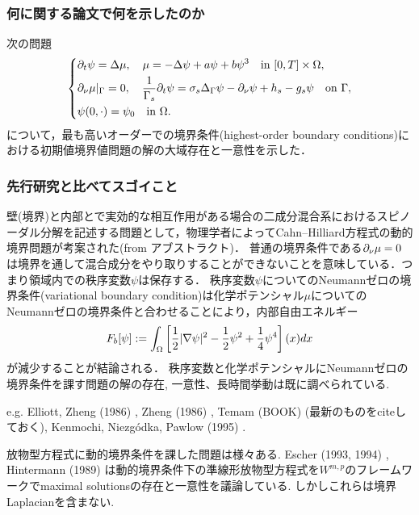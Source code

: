 \documentclass[openary, a4paper, oneside]{jsarticle}
\begin{document}
	\subsubsection{何に関する論文で何を示したのか}
		次の問題
		\begin{equation}\left\{\begin{aligned}
			&\partial_t\psi = \Delta\mu,\quad \mu = -\Delta\psi + a\psi + b\psi^3\quad \text{in }[0,T]\times\Omega,\\
			&\partial_{\nu}\mu|_{\Gamma} = 0, \quad \frac{1}{\Gamma_s}\partial_t\psi = \sigma_s\Delta_{\Gamma}\psi - \partial_{\nu}\psi + h_s - g_s\psi\quad\text{on }\Gamma,\\
			&\psi(0,\cdot) = \psi_0\quad\text{in }\Omega.
		\end{aligned}\right.\end{equation}
		について，最も高いオーダーでの境界条件(highest-order boundary conditions)における初期値境界値問題の解の大域存在と一意性を示した．
	\subsubsection{先行研究と比べてスゴイこと}
		壁(境界)と内部とで実効的な相互作用がある場合の二成分混合系におけるスピノーダル分解を記述する問題として，物理学者によってCahn--Hilliard方程式の動的境界問題が考案された(from アブストラクト)．
		普通の境界条件である$\partial_{\nu}\mu=0$は境界を通して混合成分をやり取りすることができないことを意味している．つまり領域内での秩序変数$\psi$は保存する．
		秩序変数$\psi$についてのNeumannゼロの境界条件(variational boundary condition)は化学ポテンシャル$\mu$についてのNeumannゼロの境界条件と合わせることにより，内部自由エネルギー
		\begin{equation}
			F_b[\psi] := \int_{\Omega} \left[\frac{1}{2}|\nabla\psi|^2 - \frac{1}{2}\psi^2 + \frac{1}{4}\psi^4\right](x)dx
		\end{equation}
		が減少することが結論される．
		秩序変数と化学ポテンシャルにNeumannゼロの境界条件を課す問題の解の存在, 一意性、長時間挙動は既に調べられている.
		
		e.g. Elliott, Zheng (1986) \cite{ElliottZheng1986}, Zheng (1986) \cite{Zheng1986}, Temam (BOOK) \cite{TemamBOOK} (最新のものをciteしておく), Kenmochi, Niezg\'odka, Pawlow (1995) \cite{KenmochiNiezgodkaPawlow1995}.

		放物型方程式に動的境界条件を課した問題は様々ある.
		Escher (1993, 1994) \cite{Escher1993,Escher1994}, Hintermann (1989) \cite{Hintermann1989} は動的境界条件下の準線形放物型方程式を$W^{m,p}$のフレームワークでmaximal solutionsの存在と一意性を議論している.
		しかしこれらは境界Laplacianを含まない.
\end{document}
